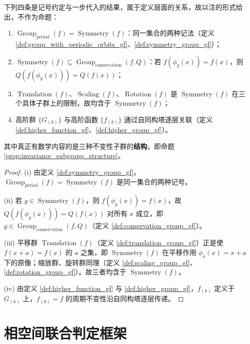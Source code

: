 \begin{remark}[关于 8 组概念对的群关系]\label{rem:concept_pair_relations}
下列四条是记号约定与一步代入的结果，属于定义层面的关系，故以注的形式给出，不作为命题：
\begin{enumerate}[label=(\roman*)]
    \item $\operatorname{Group}_{\mathrm{period}}(f)=\operatorname{Symmetry}(f)$：同一集合的两种记法（定义 \ref{def:group_with_periodic_orbits_gf}、\ref{def:symmetry_group_gf}）；
    \item $\operatorname{Symmetry}(f)\subseteq\operatorname{Group}_{\mathrm{conservation}}(f,Q)$：若 $f(\phi_g(x))=f(x)$，则 $Q(f(\phi_g(x)))=Q(f(x))$；
    \item $\operatorname{Translation}(f)$、$\operatorname{Scaling}(f)$、$\operatorname{Rotation}(f)$ 是 $\operatorname{Symmetry}(f)$ 在三个具体子群上的限制，故均含于 $\operatorname{Symmetry}(f)$；
    \item 高阶群 $\{G_{(k)}\}$ 与高阶函数 $\{f_{(k)}\}$ 通过自同构塔逐层关联（定义 \ref{def:higher_function_gf}、\ref{def:higher_group_gf}）。
\end{enumerate}
其中真正有数学内容的是三种不变性子群的\textbf{结构}，即命题 \ref{prop:invariance_subgroup_structure}。
\end{remark}

\begin{proof}
(i) 由定义 \ref{def:symmetry_group_gf}，$\operatorname{Group}_{\mathrm{period}}(f)=\operatorname{Symmetry}(f)$ 是同一集合的两种记号。

(ii) 若 $g\in\operatorname{Symmetry}(f)$，则 $f(\phi_g(x))=f(x)$，故 $Q(f(\phi_g(x)))=Q(f(x))$ 对所有 $x$ 成立，即 $g\in\operatorname{Group}_{\mathrm{conservation}}(f,Q)$（定义 \ref{def:conservation_group_gf}）。

(iii) 平移群 $\operatorname{Translation}(f)$（定义 \ref{def:translation_group_gf}）正是使 $f(x+a)=f(x)$ 的 $a$ 之集，即 $\operatorname{Symmetry}(f)$ 在平移作用 $\phi_a(x)=x+a$ 下的原像；缩放群、旋转群同理（定义 \ref{def:scaling_group_gf}、\ref{def:rotation_group_gf}）。故三者均含于 $\operatorname{Symmetry}(f)$。

(iv) 由定义 \ref{def:higher_function_gf} 与 \ref{def:higher_group_gf}，$f_{(k)}$ 定义于 $G_{(k)}$ 上，$f_{(0)}=f$ 的周期不变性沿自同构塔逐层传递。
\end{proof}

\section{\texorpdfstring{相空间联合判定框架}{相空间联合判定框架}}

